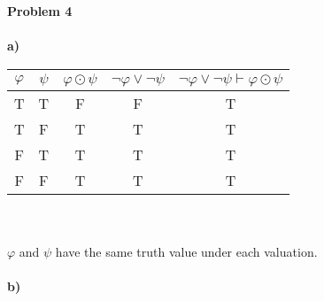 \documentclass[12pt,oneside,reqno]{amsart}
\begin{document}
\textbf{Problem 4}\\\\
\textbf{a)}\\
	\begin{tabular}{ cc|c|c|c }
		$\varphi$ & $\psi$ & $\varphi \odot \psi$ & $\neg \varphi \lor \neg \psi$ & $\neg \varphi \lor \neg \psi \vdash \varphi \odot \psi$ \\ \hline
		T & T & 	F & F & T \\
		T & F & 	T & T & T \\
		F & T & 	T & T & T \\
		F & F & 	T & T & T \\
	\end{tabular}\\\\
$\varphi$ and $\psi$ have the same truth value under each valuation.\\\\

\textbf{b)}\\
\end{document}
